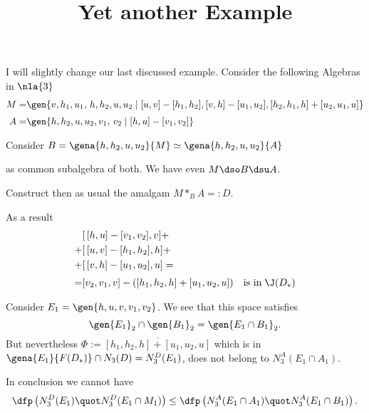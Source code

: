 \documentclass[a4paper,11pt,german,english]{article}
\title{Yet another Example}
\begin{document}
\maketitle
I will slightly change our last discussed example.
Consider the following Algebras in $\nla{3}$
\begin{align*}
M=&\gen{v,h_{1},u_{1},\,h,h_{2},u,u_{2}\mid[u,v]-[h_{1},h_{2}],[v,h]-[u_{1},u_{2}],[h_{2},h_{1},h]+[u_{2},u_{1},u]}\\[+1mm]
A=&\gen{h,h_{2},u,u_{2},v_{1},\,v_{2}\mid[h,u]-[v_{1},v_{2}]}%
\end{align*}

Consider $B=\gena{h,h_{2},u,u_{2}}{M}
\simeq\gena{h,h_{2},u,u_{2}}{A}$

as common subalgebra of both. We have even $M\dso B\dsu A$.

\medskip
Construct
then as usual the amalgam $M \ast_{B} A=:D$.

\smallskip
As a result
\begin{align*}
&[\,[h,u]-[v_{1},v_{2}],v]+\\
+&[\,[u,v]-[h_{1},h_{2}],h]+\\
+&[\,[v,h]-[u_{1},u_{2}],u]=\\[+1mm]
=&[v_{2},v_{1},v]-([h_{1},h_{2},h]+[u_{1},u_{2},u])\quad\text{is in}\;\J(D_{*})
\end{align*}


\smallskip
Consider $E_{1}=\gen{h,u,v,v_{1},v_{2}}$. We see that this space satisfies
$$\gen{E_{1}}_{2}\cap\gen{B_{1}}_{2}=\gen{E_{1}\cap B_{1}}_{2}.$$
But nevertheless $\Phi:=\overline{[h_{1},h_{2},h]+[u_{1},u_{2},u]}$
which is in $\gena{E_{1}}{F(D_{*})}\cap N_{3}(D)=N_{3}^{D}(E_{1})$, does not belong %
to $N_{3}^{A}(E_{1}\cap A_{1})$.

\medskip
In conclusion we cannot have
$$\dfp\left(N_{3}^{D}(E_{1})\quot N_{3}^{D}(E_{1}\cap M_{1})\right)\leq
\dfp\left(N_{3}^{A}(E_{1}\cap A_{1})\quot N_{3}^{A}(E_{1}\cap B_{1})\right).$$
\end{document}
